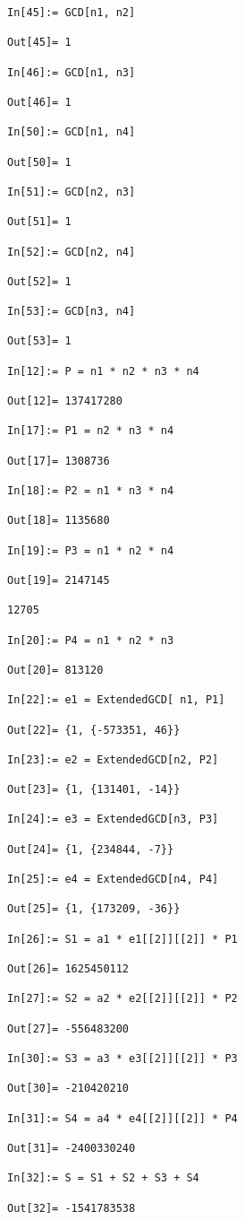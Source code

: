 \documentclass[12pt]{amsart}
\theoremstyle{definition}
\begin{document}
\begin{enumerate}
\begin{verbatim}
In[45]:= GCD[n1, n2]

Out[45]= 1

In[46]:= GCD[n1, n3]

Out[46]= 1

In[50]:= GCD[n1, n4]

Out[50]= 1

In[51]:= GCD[n2, n3]

Out[51]= 1

In[52]:= GCD[n2, n4]

Out[52]= 1

In[53]:= GCD[n3, n4]

Out[53]= 1

In[12]:= P = n1 * n2 * n3 * n4

Out[12]= 137417280

In[17]:= P1 = n2 * n3 * n4

Out[17]= 1308736

In[18]:= P2 = n1 * n3 * n4

Out[18]= 1135680

In[19]:= P3 = n1 * n2 * n4

Out[19]= 2147145

12705

In[20]:= P4 = n1 * n2 * n3

Out[20]= 813120

In[22]:= e1 = ExtendedGCD[ n1, P1]

Out[22]= {1, {-573351, 46}}

In[23]:= e2 = ExtendedGCD[n2, P2]

Out[23]= {1, {131401, -14}}

In[24]:= e3 = ExtendedGCD[n3, P3]

Out[24]= {1, {234844, -7}}

In[25]:= e4 = ExtendedGCD[n4, P4]

Out[25]= {1, {173209, -36}}

In[26]:= S1 = a1 * e1[[2]][[2]] * P1

Out[26]= 1625450112

In[27]:= S2 = a2 * e2[[2]][[2]] * P2

Out[27]= -556483200

In[30]:= S3 = a3 * e3[[2]][[2]] * P3

Out[30]= -210420210

In[31]:= S4 = a4 * e4[[2]][[2]] * P4

Out[31]= -2400330240

In[32]:= S = S1 + S2 + S3 + S4

Out[32]= -1541783538


\end{verbatim}
\end{enumerate}
\end{document}
